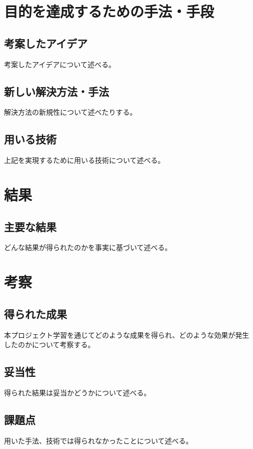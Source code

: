 \chapter{目的を達成するための手法・手段}
\section{考案したアイデア}
考案したアイデアについて述べる。

\section{新しい解決方法・手法}
解決方法の新規性について述べたりする。

\section{用いる技術}
上記を実現するために用いる技術について述べる。

\chapter{結果}
\section{主要な結果}
どんな結果が得られたのかを事実に基づいて述べる。

\chapter{考察}
\section{得られた成果}
本プロジェクト学習を通じてどのような成果を得られ、どのような効果が発生したのかについて考察する。

\section{妥当性}
得られた結果は妥当かどうかについて述べる。

\section{課題点}
用いた手法、技術では得られなかったことについて述べる。

